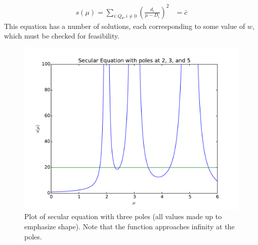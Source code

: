 \documentclass[conference]{IEEEtran}
\begin{document}
\begin{align}\label{secular}
s(\mu) = \sum_{i:Q{_\theta,i}\neq 0} \left(\frac{d_i}{\mu - D_i}\right)^2 &= \bar{c}
\end{align}
This equation has a number of solutions, each corresponding to some value of $w$, which must be checked for feasibility.

\begin{figure}
\centering
\includegraphics[width=0.9\linewidth]{../images/secular}
\caption{Plot of secular equation with three poles (all values made up to emphasize shape). Note that the function approaches infinity at the poles.}
\label{fig:secular}
\end{figure}






%

%


\end{document}
